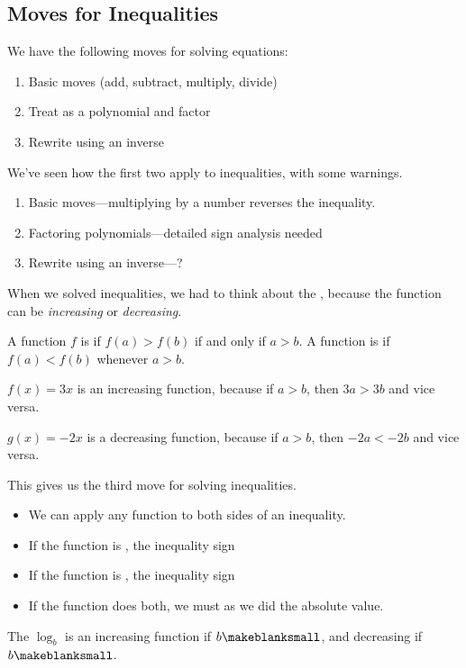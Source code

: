 \subsection{Moves for Inequalities} 
We have the following moves for solving equations:
\begin{enumerate}
\item Basic moves (add, subtract, multiply, divide)
\item Treat as a polynomial and factor
\item Rewrite using an inverse
\end{enumerate}
We've seen how the first two apply to inequalities, with some warnings.
\begin{enumerate}
\item Basic moves---multiplying by a \makeblank[1in] number reverses the inequality.
\item Factoring polynomials---detailed sign analysis needed
\item Rewrite using an inverse---?
\end{enumerate}
When we solved \makeblank inequalities, we had to think about the \makeblank, because the \makeblank function can be \emph{increasing} or \emph{decreasing}.
\begin{definition}
A function $f$ is  if $f(a)>f(b)$ if and only if $a>b$. A function is  if $f(a)<f(b)$ whenever $a>b$.
\end{definition}
\begin{Example}
$f(x)=3x$ is an increasing function, because if $a>b$, then $3a>3b$ and vice versa.
\end{Example}
\begin{Example}
$g(x)=-2x$ is a decreasing function, because if $a>b$, then $-2a<-2b$ and vice versa.
\end{Example}
This gives us the third move for solving inequalities.
\begin{itemize}
\item We can apply any function to both sides of an inequality.
\item If the function is \makeblank[1in], the inequality sign \makeblank[1.5in]
\item If the function is \makeblank[1in], the inequality sign \makeblank[1.5in]
\item If the function does both, we must \makeblank as we did the absolute value.
\end{itemize}
The $\log_b$ is an increasing function if $b\makeblanksmall$, and decreasing if $b\makeblanksmall$.